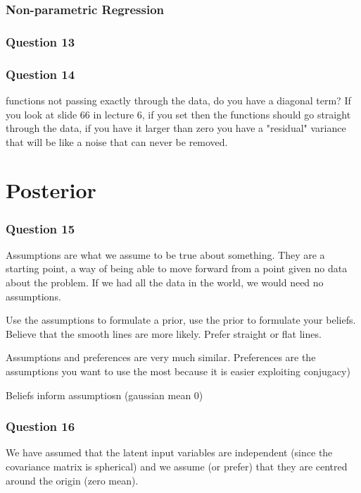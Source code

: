\documentclass[10pt, a4paper, twocolumn]{article} %
\begin{document}
\subsubsection{Non-parametric Regression}

\subsubsection*{Question 13}



\subsubsection*{Question 14}

functions not passing exactly through the data, do you have a diagonal term?
If you look at slide 66 in lecture 6, if you set  then the functions
should go straight through the data, if you have it larger than zero you have
a "residual" variance that will be like a noise that can never be removed.

\section{Posterior}

\subsubsection*{Question 15}

Assumptions are what we assume to be true about something. They are a starting point, a way of being able to move forward from a point given no data about the problem. If we had all the data in the world, we would need no assumptions.

Use the assumptions to formulate a prior, use the prior to formulate your beliefs. Believe that the smooth lines are more likely. Prefer straight or flat lines.

Assumptions and preferences are very much similar. Preferences are the assumptions you want to use the most because it is easier exploiting conjugacy)

Beliefs inform assumptiosn (gaussian mean 0)

\subsubsection*{Question 16}

We have assumed that the latent input variables are independent (since the covariance matrix is spherical) and we assume (or prefer) that they are centred around the origin (zero mean).
\end{document}
